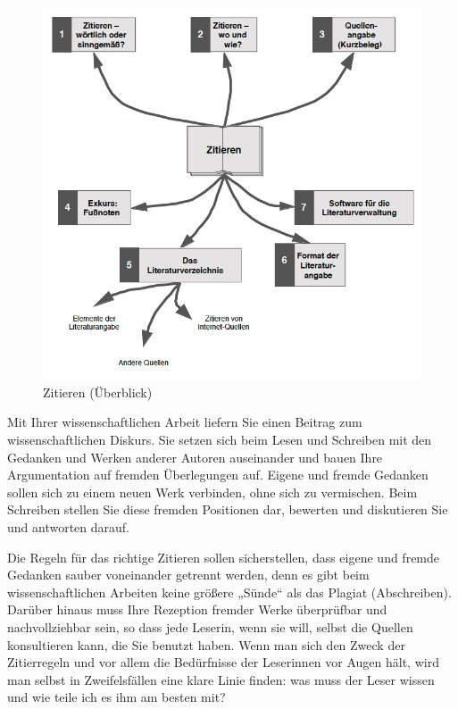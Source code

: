 \documentclass[]{book}
\theoremstyle{definition}
\theoremstyle{definition}
\theoremstyle{definition}
\theoremstyle{remark}
\begin{document}
\begin{figure}

{\centering \includegraphics{images/zitieren-min} 

}

\caption{Zitieren (Überblick)}\label{fig:unnamed-chunk-22}
\end{figure}



Mit Ihrer wissenschaftlichen Arbeit liefern Sie einen Beitrag zum
wissenschaftlichen Diskurs. Sie setzen sich beim Lesen und Schreiben mit
den Gedanken und Werken anderer Autoren auseinander und bauen Ihre
Argumentation auf fremden Überlegungen auf. Eigene und fremde Gedanken
sollen sich zu einem neuen Werk verbinden, ohne sich zu vermischen. Beim
Schreiben stellen Sie diese fremden Positionen dar, bewerten und
diskutieren Sie und antworten darauf.

Die Regeln für das richtige Zitieren sollen sicherstellen, dass eigene
und fremde Gedanken sauber voneinander getrennt werden, denn es gibt
beim wissenschaftlichen Arbeiten keine größere „Sünde`` als das Plagiat
(Abschreiben). Darüber hinaus muss Ihre Rezeption fremder Werke
überprüfbar und nachvollziehbar sein, so dass jede Leserin, wenn sie
will, selbst die Quellen konsultieren kann, die Sie benutzt haben. Wenn
man sich den Zweck der Zitierregeln und vor allem die Bedürfnisse der
Leserinnen vor Augen hält, wird man selbst in Zweifelsfällen eine klare
Linie finden: was muss der Leser wissen und wie teile ich es ihm am
besten mit?
\end{document}
